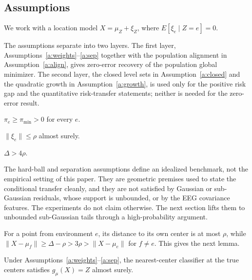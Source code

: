 \subsection{Assumptions}\label{assumptions}

We work with a location model \(X=\mu_Z+\xi_Z\), where
\(E[\xi_e\mid Z=e]=0\).

The assumptions separate into two layers. The first layer,
Assumptions~\ref{a:weights}--\ref{a:sep} together with
the population alignment in Assumption~\ref{a:align},
gives zero-error recovery of the population global minimizer. The second
layer, the closed level sets in
Assumption~\ref{a:closed} and the quadratic growth in
Assumption~\ref{a:growth}, is used only for the positive
risk gap and the quantitative risk-transfer statements; neither is
needed for the zero-error result.

\begin{assumption}[weights]\label{a:weights}
$\pi_e\ge\pi_{\min}>0$ for every $e$.
\end{assumption}

\begin{assumption}\label{a:conc}
$\|\xi_e\|\le\rho$ almost surely.
\end{assumption}

\begin{assumption}[separation]\label{a:sep}
$\Delta>4\rho$.
\end{assumption}

The hard-ball and separation assumptions define an idealized benchmark,
not the empirical setting of this paper. They are geometric premises
used to state the conditional transfer cleanly, and they are not
satisfied by Gaussian or sub-Gaussian residuals, whose support is
unbounded, or by the EEG covariance features. The experiments do not
claim otherwise. The next section lifts them to unbounded sub-Gaussian
tails through a high-probability argument.

For a point from environment \(e\), its distance to its own center is at
most \(\rho\), while \(\|X-\mu_f\|\ge\Delta-\rho>3\rho>\|X-\mu_e\|\) for
\(f\ne e\). This gives the next lemma.

\begin{lemma}\label{lem:truecenter}
Under Assumptions~\ref{a:weights}--\ref{a:sep}, the nearest-center classifier at the true centers satisfies $g_\mu(X)=Z$ almost surely.
\end{lemma}

